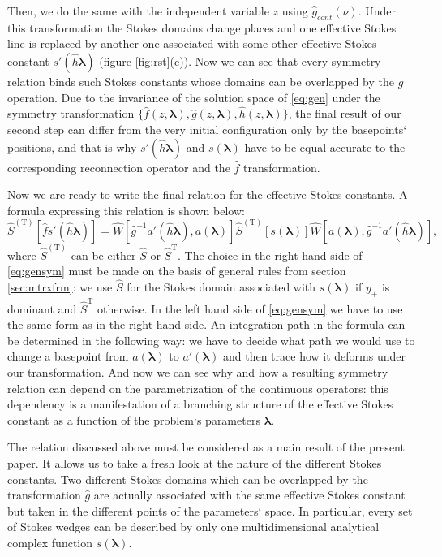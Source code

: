 \documentclass[atmp]{ipart_v1}
\def\S{\widehat{S}}
\def\W{\widehat{W}}
\def\f{\hat{f}}
\def\g{\hat{g}}
\def\h{\hat{h}}
\def\lmbd{\bm{\lambda}}
\def\Tp{\mathrm{T}}
\newcommand\eref[1]{\eqref{#1}}
\newcommand\fref[1]{figure \ref{#1}}
\newcommand\sref[1]{section \ref{#1}}
\begin{document}
Then, we do the same with the independent variable $z$ using $\g_{cont}(\nu)$. Under this 
transformation the Stokes domains change places and one effective Stokes line is replaced by another one 
associated with some other effective Stokes constant $s'(\h\lmbd)$ (\fref{fig:rst}(c)). Now we can see that
every symmetry relation binds such Stokes constants whose domains can be overlapped by the $\g$ 
operation. Due to the invariance of the solution space of \eref{eq:gen} 
under the symmetry transformation $\{\f(z,\lmbd),\g(z,\lmbd),\h(z,\lmbd)\}$, 
the final result of our second step can differ from the very initial 
configuration only by the basepoints` positions, and that is why $s'(\h\lmbd)$ 
and $s(\lmbd)$ have to be equal accurate to the corresponding reconnection operator
and the $\f$ transformation.

Now we are ready to write the final relation for the effective Stokes constants. A formula
expressing this relation is shown below:
\begin{equation}
\S^{(\Tp)} \left[ \f s'(\h\lmbd) \right] = 
\W \left[ \g^{-1}a'(\h\lmbd),a(\lmbd) \right]
\S^{(\Tp)} \left[ s(\lmbd) \right]
\W \left[ a(\lmbd), \g^{-1} a'(\h\lmbd) \right],
\label{eq:gensym}
\end{equation}
where $\S^{(\Tp)}$ can be either $\S$ or $\S^{\Tp}$. The choice in the right hand side 
of \eref{eq:gensym} must be made on the basis of general rules from \sref{sec:mtrxfrm}: 
we use $\S$ for the Stokes domain associated with $s(\lmbd)$ if $y_+$ is dominant 
and $\S^{\Tp}$ otherwise. In the left hand side of \eref{eq:gensym} we have to use the 
same form as in the right hand side. An integration path in the formula can be determined 
in the following way: we have to decide what path we would use to change a basepoint 
from $a(\lmbd)$ to $a'(\lmbd)$ and then trace how it deforms under our transformation. 
And now we can see why and how a resulting symmetry relation can depend on the parametrization 
of the continuous operators: this dependency is a manifestation of a branching structure of 
the effective Stokes constant as a function of the problem`s parameters $\lmbd$.

The relation discussed above must be considered as a main result of the present paper.
It allows us to take a fresh look at the nature of the different Stokes constants. 
Two different Stokes domains which can be overlapped by the transformation $\g$ are 
actually associated with the same effective Stokes constant but taken in the different 
points of the parameters` space. In particular, every set of Stokes wedges can be described 
by only one multidimensional analytical complex function $s(\lmbd)$.
\end{document}
